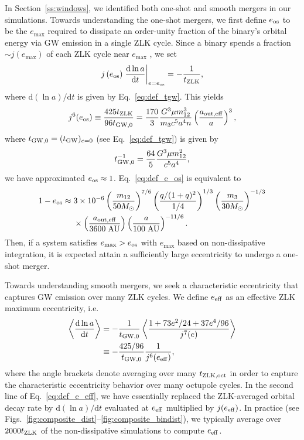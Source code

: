 \documentclass[
        fleqn,
        usenatbib,
    ]{mnras}
\newcommand*{\rd}[2]{\frac{\mathrm{d}#1}{\mathrm{d}#2}}
\newcommand*{\rdil}[2]{\mathrm{d}#1/\mathrm{d}#2}
\newcommand*{\at}[1]{\left.#1\right|}
\newcommand*{\ev}[1]{\left\langle#1\right\rangle}
\newcommand*{\p}[1]{\left(#1\right)}
\begin{document}
In Section~\ref{ss:windows}, we identified both one-shot and smooth mergers in
our simulations. Towards understanding the one-shot mergers, we first define
$e_{\rm os}$ to be the $e_{\max}$ required to dissipate an order-unity fraction
of the binary's orbital energy via GW emission in a single ZLK cycle. Since a
binary spends a fraction $\sim j(e_{\max})$ of each ZLK cycle near $e_{\max}$
\citep[e.g.,][]{anderson2016formation}, we set
\begin{align}
    j\p{e_{\rm os}}\at{\rd{\ln a}{t}}_{e = e_{\rm os}} =
        -\frac{1}{t_{\rm ZLK}},
\end{align}
where $\rdil{(\ln a)}{t}$ is given by Eq.~\eqref{eq:def_tgw}. This yields
\begin{align}
    j^6(e_{\rm os}) \equiv \frac{425 t_{\rm ZLK}}{96t_{\rm GW, 0}}
        =
        \frac{170}{3}
            \frac{G^3 \mu m_{12}^3}{m_3c^5a^4n}
            \p{\frac{a_{\rm out, eff}}{a}}^3,
            \label{eq:def_e_os}
\end{align}
where $t_{\rm GW, 0} = (t_{\rm GW})_{e = 0}$ (see Eq.~\ref{eq:def_tgw}) is given
by
\begin{align}
    t_{\rm GW, 0}^{-1} = \frac{64}{5}\frac{G^3 \mu m_{12}^2}{c^5a^4},
\end{align}
we have approximated $e_{\rm os} \approx 1$. Eq.~\eqref{eq:def_e_os} is
equivalent to
\begin{align}
    1 - e_{\rm os} \approx{}& 3 \times 10^{-6}
        \p{\frac{m_{12}}{50M_{\odot}}}^{7/6}
        \p{\frac{q / (1 + q)^2}{1/4}}^{1/3}
        \p{\frac{m_3}{30M_{\odot}}}^{-1/3}\nonumber\\
        &\times \p{\frac{a_{\rm out, eff}}{3600 \;\mathrm{AU}}}
            \p{\frac{a}{100\;\mathrm{AU}}}^{-11/6}.
\end{align}
Then, if a system satisfies $e_{\max} > e_{\rm os}$ with $e_{\max}$ based on
non-dissipative integration, it is expected attain a sufficiently large
eccentricity to undergo a one-shot merger.

Towards understanding smooth mergers, we seek a characteristic eccentricity that
captures GW emission over many ZLK cycles. We define $e_{\rm eff}$ as an
effective ZLK maximum eccentricity, i.e.
\begin{align}
    \ev{\rd{\ln a}{t}} &= -\frac{1}{t_{\rm GW, 0}}
            \ev{\frac{1 + 73e^2/24 + 37e^4/96}
                {j^7(e)}}\nonumber\\
        &\equiv -\frac{425/96}{t_{\rm GW, 0}}\frac{1}{j^6(e_{\rm eff})},
        \label{eq:def_e_eff}
\end{align}
where the angle brackets denote averaging over many $t_{\rm ZLK,
oct}$ in order to capture the characteristic eccentricity behavior over many
octupole cycles. In the second line of Eq.~\eqref{eq:def_e_eff}, we have
essentially replaced the ZLK-averaged orbital decay rate by $\rdil{(\ln a)}{t}$
evaluated at $e_{\rm eff}$ multiplied by $j(e_{\rm eff})$. In practice (see
Figs.~\ref{fig:composite_dist}--\ref{fig:composite_bindist}), we typically
average over $2000 t_{\rm ZLK}$ of the non-dissipative simulations to compute
$e_{\rm eff}$.
\end{document}
